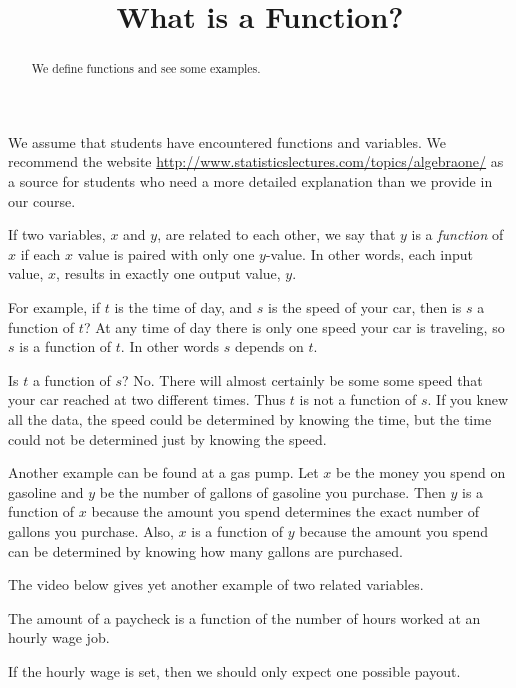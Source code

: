 \documentclass{ximera}
\title{What is a Function?}
\begin{document}
\begin{abstract}
We define functions and see some examples.
\end{abstract}
\maketitle

We assume that students have encountered functions and variables. We recommend the website \href{http://www.statisticslectures.com/topics/algebraone/}{http://www.statisticslectures.com/topics/algebraone/} as a source for students who need a more detailed explanation than we provide in our course. 

If two variables, $x$ and $y$, are related to each other, we say that $y$ is a \emph{function} of $x$ if each $x$ value is paired with only one $y$-value. In other words, each input value, $x$, results in exactly one output value, $y$.

For example, if $t$ is the time of day, and $s$ is the speed of your car, then is $s$ a function of $t$? At any time of day there is only one speed your car is traveling, so $s$ is a function of $t$. In other words $s$ depends on $t$.

Is $t$ a function of $s$? No. There will almost certainly be some some speed that your car reached at two different times. Thus $t$ is not a function of $s$. If you knew all the data, the speed could be determined by knowing the time, but the time could not be determined just by knowing the speed.

Another example can be found at a gas pump. Let $x$ be the money you spend on gasoline and $y$ be the number of gallons of gasoline you purchase. Then $y$ is a function of $x$ because the amount you spend determines the exact number of gallons you purchase. Also, $x$ is a function of $y$ because the amount you spend can be determined by knowing how many gallons are purchased.

The video below gives yet another example of two related variables.

\begin{question}
The amount of a paycheck is a function of the number of hours worked at an hourly wage job.
    \begin{multipleChoice}
    \end{multipleChoice}
    \begin{hint}
    If the hourly wage is set, then we should only expect one possible payout.
    \end{hint}
\end{question}
    
\end{document}
